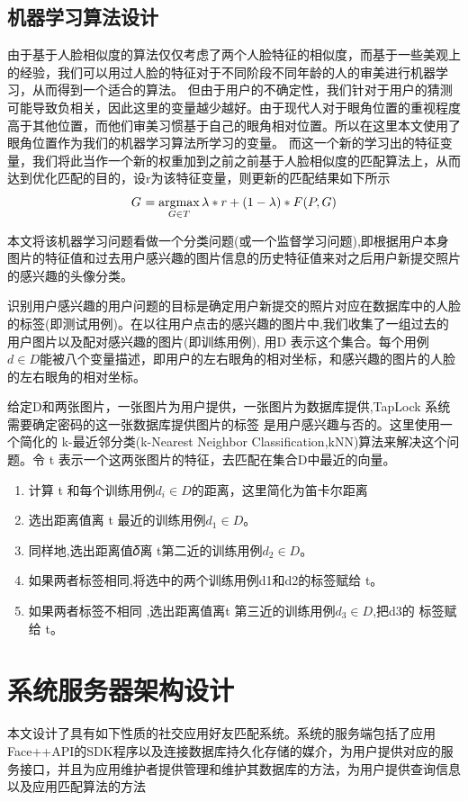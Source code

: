 \subsection{机器学习算法设计}
由于基于人脸相似度的算法仅仅考虑了两个人脸特征的相似度，而基于一些美观上的经验，我们可以用过人脸的特征对于不同阶段不同年龄的人的审美进行机器学习，从而得到一个适合的算法。
但由于用户的不确定性，我们针对于用户的猜测可能导致负相关，因此这里的变量越少越好。由于现代人对于眼角位置的重视程度高于其他位置，而他们审美习惯基于自己的眼角相对位置。所以在这里本文使用了眼角位置作为我们的机器学习算法所学习的变量。
而这一个新的学习出的特征变量，我们将此当作一个新的权重加到之前之前基于人脸相似度的匹配算法上，从而达到优化匹配的目的，设r为该特征变量，则更新的匹配结果如下所示
\begin{equation*}
G^{\*} = \mathop{\argmax_{G \in T}}{\lambda * r+(1-\lambda)* F(P,G)}
\end{equation*}

本文将该机器学习问题看做一个分类问题(或一个监督学习问题),即根据用户本身图片的特征值和过去用户感兴趣的图片信息的历史特征值来对之后用户新提交照片的感兴趣的头像分类。

识别用户感兴趣的用户问题的目标是确定用户新提交的照片对应在数据库中的人脸的标签(即测试用例)。在以往用户点击的感兴趣的图片中,我们收集了一组过去的用户图片以及配对感兴趣的图片(即训练用例), 用D 表示这个集合。每个用例$d \in D$能被八个变量描述，即用户的左右眼角的相对坐标，和感兴趣的图片的人脸的左右眼角的相对坐标。

给定D和两张图片，一张图片为用户提供，一张图片为数据库提供,TapLock 系统需要确定密码的这一张数据库提供图片的标签 是用户感兴趣与否的。这里使用一个简化的 k-最近邻分类(k-Nearest Neighbor Classification,kNN)算法来解决这个问题。令 t 表示一个这两张图片的特征，去匹配在集合D中最近的向量。
\begin{enumerate}
\item 计算 t 和每个训练用例$d_{i} \in D$的距离，这里简化为笛卡尔距离
\item 选出距离值离 t 最近的训练用例$d_{1} \in D$。
\item 同样地,选出距离值𝛿离 t第二近的训练用例$d_{2} \in D$。
\item 如果两者标签相同,将选中的两个训练用例d1和d2的标签赋给 t。
\item 如果两者标签不相同 ,选出距离值离t 
第三近的训练用例$d_{3} \in D$,把d3的
标签赋给 t。
\end{enumerate}

\section{系统服务器架构设计}
本文设计了具有如下性质的社交应用好友匹配系统。系统的服务端包括了应用Face++API的SDK程序以及连接数据库持久化存储的媒介，为用户提供对应的服务接口，并且为应用维护者提供管理和维护其数据库的方法，为用户提供查询信息以及应用匹配算法的方法

